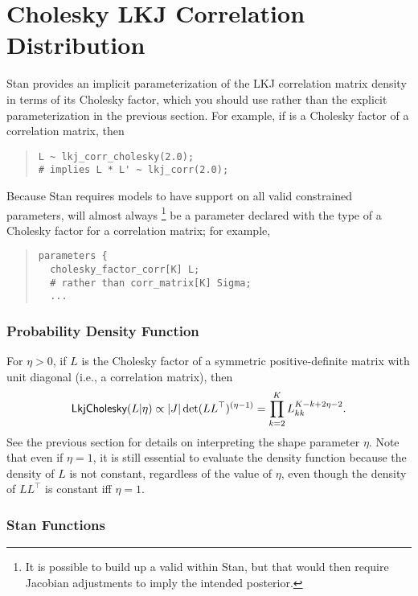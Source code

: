 \section{Cholesky LKJ Correlation Distribution}

Stan provides an implicit parameterization of the LKJ correlation matrix
density in terms of its Cholesky factor, which you should use rather
than the explicit parameterization in the previous section. For example, 
if  is a Cholesky factor of a correlation matrix, then
%
\begin{quote}
\begin{Verbatim}
L ~ lkj_corr_cholesky(2.0);
# implies L * L' ~ lkj_corr(2.0);
\end{Verbatim}
\end{quote}
%
Because Stan requires models to have support on all valid constrained
parameters,  will almost always
%
\footnote{It is possible to build up a valid  within Stan, but that
would then require Jacobian adjustments to imply the intended posterior.}
%
be a parameter declared with the type of a
Cholesky factor for a correlation matrix; for example,
%
\begin{quote}
\begin{Verbatim}
parameters {
  cholesky_factor_corr[K] L; 
  # rather than corr_matrix[K] Sigma;
  ...
\end{Verbatim}
\end{quote}
%


\subsubsection{Probability Density Function}

For $\eta > 0$, if $L$ is the Cholesky factor of a symmetric
positive-definite matrix with unit diagonal (i.e., a correlation
matrix), then
\[
\distro{LkjCholesky}(L|\eta) 
\propto \left|J\right|\det(L L^\top)^{(\eta - 1)} 
= \prod_{k=2}^K L_{kk}^{K-k+2\eta-2}.
\]
See the previous section for details on interpreting the shape
parameter $\eta$. Note that even if $\eta=1$, it is still essential to
evaluate the density function because the density of $L$ is not
constant, regardless of the value of $\eta$, even though the density of
$LL^\top$ is constant iff $\eta=1$.


\subsubsection{Stan Functions}

